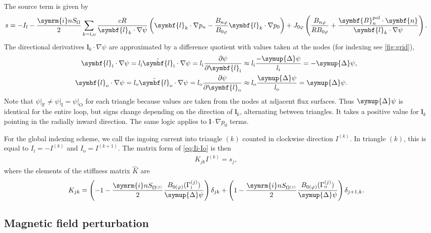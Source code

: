 \documentclass[a4paper, twoside, 10pt, english]{article}
\numberwithin{equation}{section}
\let\temp\varrho
\let\varrho\rho
\let\rho\temp
\let\temp\vartheta
\let\vartheta\theta
\let\theta\temp
\let\temp\varphi
\let\varphi\phi
\let\phi\temp
\let\vec\symbf
\newcommand*\grad{\ensuremath{\nabla}}
\newcommand*\im{\ensuremath{\symrm{i}}}  %
\newcommand*\pd[2][]{\ensuremath{\frac{\partial #1}{\partial #2}}}  %
\newcommand*\pol{\ensuremath{\textrm{pol}}}  %
\newcommand*\fs{\ensuremath{\textrm{f}}}  %
\newcommand*\inw{\ensuremath{\textrm{i}}}  %
\newcommand*\out{\ensuremath{\textrm{o}}}  %
\newcommand*\vfs{\ensuremath{\textrm{F}}}  %
\newcommand*\vinw{\ensuremath{\textrm{I}}}  %
\newcommand*\vout{\ensuremath{\textrm{O}}}  %
\begin{document}
The source term is given by
\begin{gather}
  s = -I_{\fs} - \frac{\im n S_{\Omega}}{2} \sum_{k = \inw, \out} \frac{c R}{\vec{l}_{k} \cdot \grad \psi} \left( \vec{l}_{k} \cdot \grad p_{n} - \frac{B_{n \phi}}{B_{0 \phi}} \vec{l}_{k} \cdot \grad p_{0} \right) + J_{0 \phi} \left( \frac{B_{n \phi}}{R B_{0 \phi}} + \frac{\vec{B}_{n}^{\pol} \cdot \vec{n}}{\vec{l}_{k} \cdot \grad \psi} \right).
\end{gather}
The directional derivatives $\vec{l}_{k} \cdot \grad \psi$ are approximated by a difference quotient with values taken at the nodes (for indexing see \cref{fig:grid}),
\begin{align}
  \vec{l}_{\inw} \cdot \grad \psi = l_{\inw} \hat{\vec{l}}_{\inw} \cdot \grad \psi = l_{\inw} \pd[\psi]{\vec{l}_{\inw}} & \approx l_{\inw} \frac{-\symup{\Delta} \psi}{l_{\inw}} = -\symup{\Delta} \psi, \\
  \vec{l}_{\out} \cdot \grad \psi = l_{\out} \hat{\vec{l}}_{\out} \cdot \grad \psi = l_{\out} \pd[\psi]{\vec{l}_{\out}} & \approx l_{\out} \frac{\symup{\Delta} \psi}{l_{\out}} = \symup{\Delta} \psi.
\end{align}
Note that $\psi \vert_{\vfs} \neq \psi \vert_{\vinw} = \psi \vert_{\vout}$ for each triangle because values are taken from the nodes at adjacent flux surfaces. Thus $\symup{\Delta} \psi$ is identical for the entire loop, but signs change depending on the direction of $\vec{l}_{k}$, alternating between triangles. It takes a positive value for $\vec{l}_{k}$ pointing in the radially inward direction. The same logic applies to $\vec{l} \cdot \grad p_{0}$ terms.

For the global indexing scheme, we call the ingoing current into triangle $(k)$ counted in clockwise direction $I^{(k)}$. In triangle $(k)$, this is equal to $I_{\inw} = -I^{(k)}$ and $I_{\out} = I^{(k+1)}$. The matrix form of \cref{eq:Ii-Io} is then
\begin{gather}
  K_{jk} I^{(k)} = s_{j},
\end{gather}
where the elements of the stiffness matrix $\hat{K}$ are
\begin{gather}
  K_{jk} = \left( -1 - \frac{\im n S_{\Omega^{(j)}}}{2} \frac{B_{0 (\phi)} (\Gamma_{\inw}^{(j)})}{\symup{\Delta} \psi} \right) \delta_{jk} + \left( 1 - \frac{\im n S_{\Omega^{(j)}}}{2} \frac{B_{0 (\phi)} (\Gamma_{\out}^{(j)})}{\symup{\Delta} \psi} \right) \delta_{j+1, k}.
\end{gather}

\subsection{Magnetic field perturbation}
\label{sec:compute_Bn}
\end{document}
